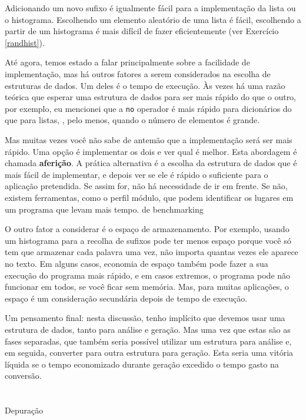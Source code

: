 \documentclass[10pt]{book}
\begin{document}
\begin{exercise}
\begin{v erbatim}
{Adicionando um novo sufixo é igualmente fácil para a implementação da lista
ou o histograma. Escolhendo um elemento aleatório de uma lista
é fácil, escolhendo a partir de um histograma é mais difícil de fazer
eficientemente (ver Exercício ~ \ref {randhist}).

Até agora, temos estado a falar principalmente sobre a facilidade de implementação,
mas há outros fatores a serem considerados na escolha de estruturas de dados.
Um deles é o tempo de execução. Às vezes há uma razão teórica que esperar
uma estrutura de dados para ser mais rápido do que o outro, por exemplo, eu mencionei
que a {\tt no} operador é mais rápido para dicionários do que para listas,
, pelo menos, quando o número de elementos é grande.

Mas muitas vezes você não sabe de antemão que a implementação será
ser mais rápido. Uma opção é implementar os dois e ver qual
é melhor. Esta abordagem é chamada {\bf aferição}. A prática
alternativa é a escolha da estrutura de dados que é
mais fácil de implementar, e depois ver se ele é rápido o suficiente para o
aplicação pretendida. Se assim for, não há necessidade de ir em frente. Se não,
existem ferramentas, como o perfil {\tt} módulo, que podem identificar
os lugares em um programa que levam mais tempo.
\index{} de benchmarking

O outro fator a considerar é o espaço de armazenamento. Por exemplo, usando um
histograma para a recolha de sufixos pode ter menos espaço porque
você só tem que armazenar cada palavra uma vez, não importa quantas vezes ele
aparece no texto. Em alguns casos, economia de espaço também pode fazer a sua
execução do programa mais rápido, e em casos extremos, o programa pode não funcionar em
todos, se você ficar sem memória. Mas, para muitas aplicações, o espaço é um
consideração secundária depois de tempo de execução.

Um pensamento final: nesta discussão, tenho implícito que
devemos usar uma estrutura de dados, tanto para análise e geração. Mas
uma vez que estas são as fases separadas, que também seria possível utilizar um
estrutura para análise e, em seguida, converter para outra estrutura para
geração. Esta seria uma vitória líquida se o tempo economizado durante
geração excedido o tempo gasto na conversão.


\section{} Depuração

}
\end{v erbatim}
\end{exercise}
\end{document}
